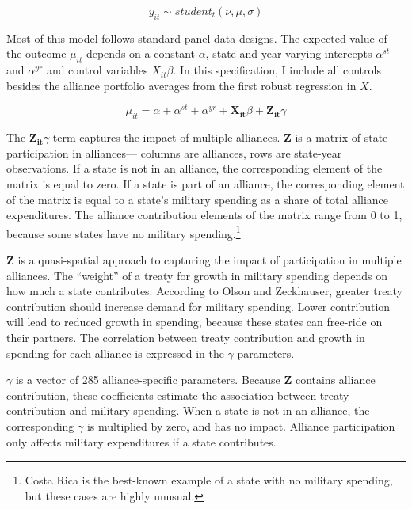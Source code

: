 \documentclass[12pt]{article}
\begin{document}
\begin{equation}
y_{it} \sim student_t(\nu, \mu, \sigma) 
\end{equation}


Most of this model follows standard panel data designs.
The expected value of the outcome $\mu_{it}$ depends on a constant $\alpha$, state and year varying intercepts $\alpha^{st}$ and $\alpha^{yr}$ and control variables $X_{it} \beta$. 
In this specification, I include all controls besides the alliance portfolio averages from the first robust regression in $X$.


\begin{equation}
\mu_{it} = \alpha + \alpha^{st} + \alpha^{yr} + \mathbf{X_{it}} \beta + \mathbf{Z_{it}} \gamma 
\end{equation}


The $\mathbf{Z_{it}} \gamma$ term captures the impact of multiple alliances. 
\textbf{Z} is a matrix of state participation in alliances--- columns are alliances, rows are state-year observations. 
If a state is not in an alliance, the corresponding element of the matrix is equal to zero. 
If a state is part of an alliance, the corresponding element of the matrix is equal to a state's military spending as a share of total alliance expenditures. 
The alliance contribution elements of the matrix range from 0 to 1, because some states have no military spending.\footnote{Costa Rica is the best-known example of a state with no military spending, but these cases are highly unusual.} 


\textbf{Z} is a quasi-spatial approach to capturing the impact of participation in multiple alliances.
The ``weight'' of a treaty for growth in military spending depends on how much a state contributes.  
According to Olson and Zeckhauser, greater treaty contribution should increase demand for military spending. 
Lower contribution will lead to reduced growth in spending, because these states can free-ride on their partners.
The correlation between treaty contribution and growth in spending for each alliance is expressed in the $\gamma$ parameters. 


$\gamma$ is a vector of 285 alliance-specific parameters.  
Because \textbf{Z} contains alliance contribution, these coefficients estimate the association between treaty contribution and military spending. 
When a state is not in an alliance, the corresponding $\gamma$ is multiplied by zero, and has no impact. 
Alliance participation only affects military expenditures if a state contributes. 
\end{document}
